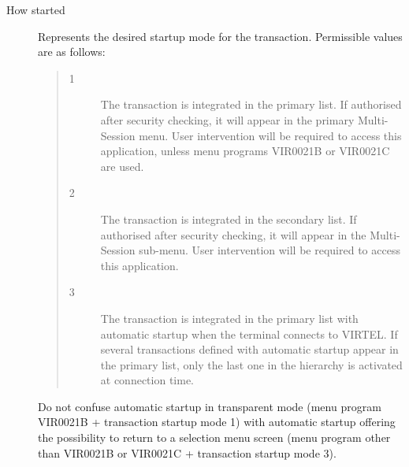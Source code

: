 \documentclass[letterpaper,10pt,english]{sphinxmanual}
\begin{document}
\begin{description}
\item[{How started}] \leavevmode
Represents the desired startup mode for the transaction. Permissible values are as follows:
\begin{quote}
\begin{description}
\item[{1}] \leavevmode
The transaction is integrated in the primary list. If authorised after security checking, it will appear in the primary Multi-Session menu. User intervention will be required to access this application, unless menu programs VIR0021B or VIR0021C are used.

\item[{2}] \leavevmode
The transaction is integrated in the secondary list. If authorised after security checking, it will appear in the Multi-Session sub-menu. User intervention will be required to access this application.

\item[{3}] \leavevmode
The transaction is integrated in the primary list with automatic startup when the terminal connects to VIRTEL. If several transactions defined with automatic startup appear in the primary list, only the last one in the hierarchy is activated at connection time.

\end{description}
\end{quote}

Do not confuse automatic startup in transparent mode (menu program VIR0021B + transaction startup mode 1) with automatic startup offering the possibility to return to a selection menu screen (menu program other than VIR0021B or VIR0021C + transaction startup mode 3).

\end{description}
\end{document}
